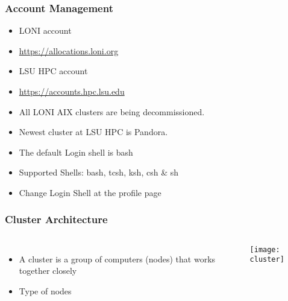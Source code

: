 \documentclass[slidestop,mathserif,compress,xcolor=svgnames,table]{beamer}
\newcommand*\vardiamond{\textcolor{tigerspurple}{%
  \ensuremath{\blacklozenge}}}
\newenvironment{bblock}[0]
{
\begin{beamerboxesrounded}[upper=uppercol1,lower=lowercol1,shadow=true]}
{\end{beamerboxesrounded}}
\newenvironment{eblock}[0]
{
\begin{beamerboxesrounded}[upper=uppercol2,lower=lowercol2,shadow=true]}
{\end{beamerboxesrounded}}
\begin{document}
\begin{frame}
\frametitle{\small Account Management}
\begin{bblock}{}
\begin{itemize}
\item LONI account
\item[] \url{https://allocations.loni.org}
\item LSU HPC account
\item[] \url{https://accounts.hpc.lsu.edu}
\item All LONI AIX clusters are being decommissioned.
\item Newest cluster at LSU HPC is Pandora.
\end{itemize}
\end{bblock}

\begin{eblock}{}
 \begin{itemize}
  \item The default Login shell is bash
  \item Supported Shells: bash, tcsh, ksh, csh \& sh
  \item Change Login Shell at the profile page
 \end{itemize}
\end{eblock}

\end{frame}

\begin{frame}
\frametitle{\small Cluster Architecture}
\begin{columns}
\column{4cm}
\begin{itemize}
\item A cluster is a group of computers (nodes) that works together closely
\item Type of nodes
\end{itemize}
\column{7cm}
\begin{center}
\texttt{[image: cluster]}
\end{center}
\end{columns}
\end{frame}
\end{document}
